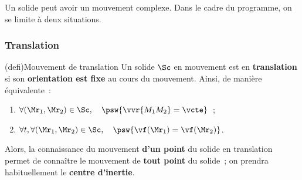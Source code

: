 \documentclass[../../main/main.tex]{subfiles}
\begin{document}
Un solide peut avoir un mouvement complexe. Dans le cadre du programme, on se
limite à deux situations.

\subsubsection{Translation}
\begin{tcb*}[sidebyside](defi){Mouvement de translation}
	Un solide $\Sc$ en mouvement est en \textbf{translation} si son
	\textbf{orientation est fixe} au cours du mouvement. Ainsi, de manière
	équivalente~:
	\begin{enumerate}
		\item $\forall (\Mr_1,\Mr_2) \in \Sc, \quad
			      \psw{\vvr{M_1M_2} = \vcte}$~;
		\item $\forall t, \forall (\Mr_1,\Mr_2) \in \Sc, \quad
			      \psw{\vf(\Mr_1) = \vf(\Mr_2)}$.
	\end{enumerate}
	\tcblower
	Alors, la connaissance du mouvement \textbf{d'un point} du solide en
	translation permet de connaître le mouvement de \textbf{tout point} du
	solide~; on prendra habituellement le \textbf{centre d'inertie}.
\end{tcb*}
\end{document}
